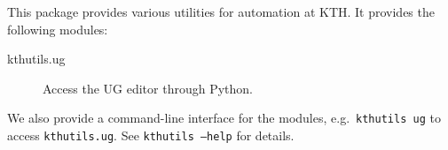 This package provides various utilities for automation at KTH.
It provides the following modules:
\begin{description}
  \item[kthutils.ug] Access the UG editor through Python.
\end{description}
We also provide a command-line interface for the modules, e.g.~\texttt{kthutils 
ug} to access \texttt{kthutils.ug}.
See \texttt{kthutils --help} for details.
